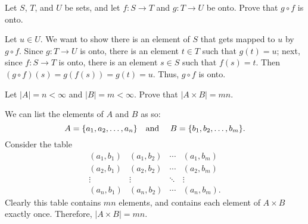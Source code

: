 \begin{exercise}[ID=1F]
Let $S$, $T$, and $U$ be sets, and let $f: S\to T$ and $g: T\to U$ be onto.  Prove that $g \circ f$ is onto.
\end{exercise}

\begin{solution}[print=false]
Let $u\in U$. We want to show there is an element of $S$ that gets mapped to $u$ by $g\circ f$. Since $g:T\to U$ is onto, there is an element $t\in T$ such that $g(t)=u$; next, since $f:S\to T$ is onto, there is an element $s\in S$ such that $f(s)=t$.  Then $(g\circ f)(s)=g(f(s))=g(t)=u$.  Thus, $g\circ f$ is onto.
\end{solution}

\begin{exercise}Let $|A|=n<\infty$ and $|B|=m< \infty$. Prove that $|A\times B|=mn$.
\end{exercise}

\begin{solution}[print=false]
We can list the elements of $A$ and $B$ as so: $$A=\{a_1,a_2,\ldots, a_n\} \mbox{\quad and \quad}B=\{b_1,b_2,\ldots, b_m\}.$$
Consider the table
$$\begin{array}{cccc}
      (a_1,b_1) & (a_1,b_2) & \cdots & (a_1,b_m) \\
      (a_2,b_1) & (a_2,b_2) & \cdots & (a_2,b_m)\\
      \vdots & \vdots  & \ddots & \vdots\\
      (a_n,b_1) & (a_n,b_2) & \cdots &  (a_n,b_m).
    \end{array}$$
Clearly this table contains $mn$ elements, and contains each element of $A\times B$ exactly once.  Therefore, $|A\times B|=mn$.

\end{solution} 